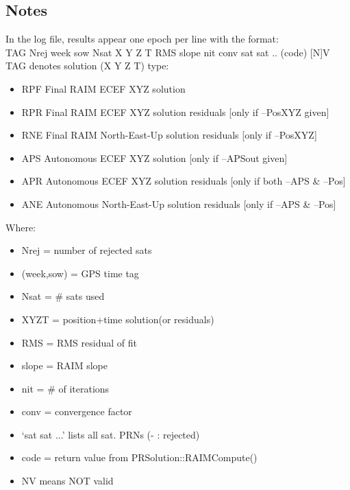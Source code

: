 \subsection{Notes}
 In the log file, results appear one epoch per line with the format:\\
 TAG Nrej week sow Nsat X Y Z T RMS slope nit conv sat sat .. (code) [N]V\\
 TAG denotes solution (X Y Z T) type:\\
\begin{itemize}
\item  RPF  Final RAIM ECEF XYZ solution
\item RPR  Final RAIM ECEF XYZ solution residuals [only if --PosXYZ given]
\item RNE  Final RAIM North-East-Up solution residuals [only if --PosXYZ]
\item  APS  Autonomous ECEF XYZ solution [only if --APSout given]
\item APR  Autonomous ECEF XYZ solution residuals [only if both --APS \& --Pos] 
\item ANE  Autonomous North-East-Up solution residuals [only if --APS \& --Pos]
\end{itemize}
Where:\\
\begin{itemize}
\item Nrej = number of rejected sats
\item (week,sow) = GPS time tag
\item Nsat = \# sats used
\item XYZT = position+time solution(or residuals)
\item RMS = RMS residual of fit
\item slope = RAIM slope
\item nit = \# of iterations
\item conv = convergence factor
\item `sat sat ...' lists all sat. PRNs (- : rejected)
\item code = return value from PRSolution::RAIMCompute()
\item NV means NOT valid
\end{itemize}
%

